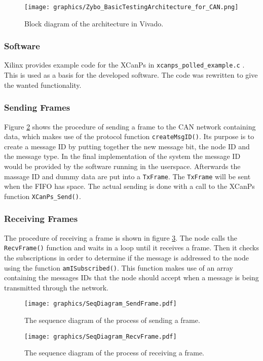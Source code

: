 \begin{figure}[h!]
	\centering
	\texttt{[image: graphics/Zybo\_BasicTestingArchitecture\_for\_CAN.png]}
	\caption{Block diagram of the architecture in Vivado.}
	\label{fig:CAN_Testing_Architecture}
\end{figure}

\subsubsection*{Software}\label{sub:Basic_SourceCode}
Xilinx provides example code for the XCanPs in \texttt{xcanps\_polled\_example.c} \cite{xcanps}.
This is used as a basis for the developed software.
The code was rewritten to give the wanted functionality.

\subsubsection*{Sending Frames}
Figure \ref{fig:SeqDiagram_SendFrame} shows the procedure of sending a frame to the CAN network containing data, which makes use of the protocol function \texttt{createMsgID()}.
Its purpose is to create a message ID by putting together the new message bit, the node ID and the message type.
In the final implementation of the system the message ID would be provided by the software running in the userspace.
Afterwards the massage ID and dummy data are put into a \texttt{TxFrame}.
The \texttt{TxFrame} will be sent when the FIFO has space.
The actual sending is done with a call to the XCanPs function \texttt{XCanPs\_Send()}.

\subsubsection*{Receiving Frames}
The procedure of receiving a frame is shown in figure \ref{fig:SeqDiagram_RecvFrame}.
The node calls the \texttt{RecvFrame()} function and waits in a loop until it receives a frame.
Then it checks the subscriptions in order to determine if the message is addressed to the node using the function \texttt{amISubscribed()}.
This function makes use of an array containing the messages IDs that the node should accept when a message is being transmitted through the network.
\begin{figure}[h!]
	\centering
	\texttt{[image: graphics/SeqDiagram\_SendFrame.pdf]}
	\caption{The sequence diagram of the process of sending a frame.}
	\label{fig:SeqDiagram_SendFrame}
\end{figure}

\begin{figure}[h!]
	\centering
	\texttt{[image: graphics/SeqDiagram\_RecvFrame.pdf]}
	\caption{The sequence diagram of the process of receiving a frame.}
	\label{fig:SeqDiagram_RecvFrame}
\end{figure}
